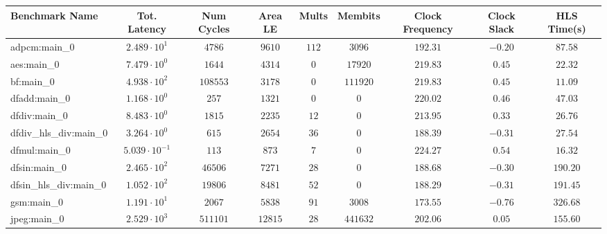 \begin{tabular}{|l|c|c|c|c|c|c|c|c|}
\hline
Benchmark Name          & Tot. Latency            & Num Cycles & Area LE   & Mults   & Membits    & Clock Frequency & Clock Slack & HLS Time(s) \\
\hline
adpcm:main\_0           & $ 2.489 \cdot 10^{1}  $ & $ 4786   $ & $ 9610  $ & $ 112 $ & $ 3096   $ & $ 192.31      $ & $ -0.20   $ & $ 87.58   $ \\
aes:main\_0             & $ 7.479 \cdot 10^{0}  $ & $ 1644   $ & $ 4314  $ & $ 0   $ & $ 17920  $ & $ 219.83      $ & $ 0.45    $ & $ 22.32   $ \\
bf:main\_0              & $ 4.938 \cdot 10^{2}  $ & $ 108553 $ & $ 3178  $ & $ 0   $ & $ 111920 $ & $ 219.83      $ & $ 0.45    $ & $ 11.09   $ \\
dfadd:main\_0           & $ 1.168 \cdot 10^{0}  $ & $ 257    $ & $ 1321  $ & $ 0   $ & $ 0      $ & $ 220.02      $ & $ 0.46    $ & $ 47.03   $ \\
dfdiv:main\_0           & $ 8.483 \cdot 10^{0}  $ & $ 1815   $ & $ 2235  $ & $ 12  $ & $ 0      $ & $ 213.95      $ & $ 0.33    $ & $ 26.76   $ \\
dfdiv\_hls\_div:main\_0 & $ 3.264 \cdot 10^{0}  $ & $ 615    $ & $ 2654  $ & $ 36  $ & $ 0      $ & $ 188.39      $ & $ -0.31   $ & $ 27.54   $ \\
dfmul:main\_0           & $ 5.039 \cdot 10^{-1} $ & $ 113    $ & $ 873   $ & $ 7   $ & $ 0      $ & $ 224.27      $ & $ 0.54    $ & $ 16.32   $ \\
dfsin:main\_0           & $ 2.465 \cdot 10^{2}  $ & $ 46506  $ & $ 7271  $ & $ 28  $ & $ 0      $ & $ 188.68      $ & $ -0.30   $ & $ 190.20  $ \\
dfsin\_hls\_div:main\_0 & $ 1.052 \cdot 10^{2}  $ & $ 19806  $ & $ 8481  $ & $ 52  $ & $ 0      $ & $ 188.29      $ & $ -0.31   $ & $ 191.45  $ \\
gsm:main\_0             & $ 1.191 \cdot 10^{1}  $ & $ 2067   $ & $ 5838  $ & $ 91  $ & $ 3008   $ & $ 173.55      $ & $ -0.76   $ & $ 326.68  $ \\
jpeg:main\_0            & $ 2.529 \cdot 10^{3}  $ & $ 511101 $ & $ 12815 $ & $ 28  $ & $ 441632 $ & $ 202.06      $ & $ 0.05    $ & $ 155.60  $ \\

\end{tabular}
